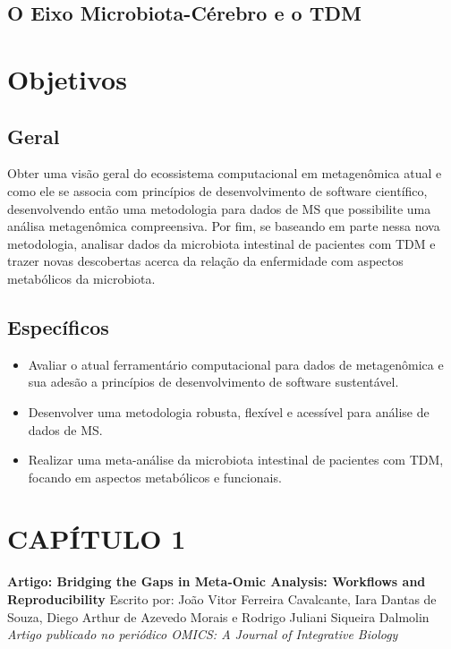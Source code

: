 \documentclass[
	12pt,				%
	oneside,			%
	a4paper,			%
	chapter=TITLE,		%
	section=TITLE,		%
	english,			%
	brazil				%
	]{abntex2}
\begin{document}
\section{O Eixo Microbiota-Cérebro e o TDM}\label{o-eixo-microbiota-cuxe9rebro-e-o-tdm}

\chapter{Objetivos}\label{obj}

\section{Geral}\label{geral}

Obter uma visão geral do ecossistema computacional em metagenômica atual e como ele se associa
com princípios de desenvolvimento de software científico, desenvolvendo então uma metodologia
para dados de \gls{MS} que possibilite uma análisa metagenômica compreensiva.
Por fim, se baseando em parte nessa nova metodologia, analisar dados da microbiota intestinal de pacientes com \gls{TDM} e trazer novas descobertas acerca da relação da enfermidade com aspectos metabólicos da microbiota.

\section{Específicos}\label{especuxedficos}
\begin{itemize}
\tightlist
\item
  Avaliar o atual ferramentário computacional para dados de metagenômica e sua adesão a princípios de desenvolvimento de software sustentável.
\item
  Desenvolver uma metodologia robusta, flexível e acessível para análise de dados de \gls{MS}.
\item
  Realizar uma meta-análise da microbiota intestinal de pacientes com \gls{TDM}, focando em aspectos metabólicos e funcionais.
\end{itemize}
\chapter*{CAPÍTULO 1}\label{cap1}
\begin{center}
\textbf{Artigo: Bridging the Gaps in Meta-Omic Analysis: Workflows and Reproducibility}
\bigskip\newline
Escrito por: João Vitor Ferreira Cavalcante, Iara Dantas de Souza, Diego Arthur de Azevedo Morais e Rodrigo Juliani Siqueira Dalmolin
\bigskip\newline
\textit{Artigo publicado no periódico OMICS: A Journal of Integrative Biology}

\end{center}
\begin{fichacatalografica}
    
\end{fichacatalografica}
\end{document}
